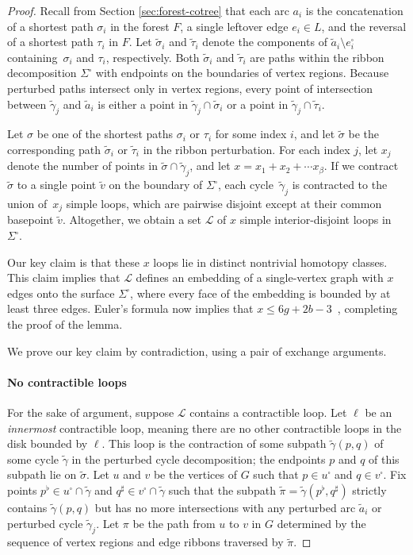 \documentclass[letterpaper,review]{siamart190516}
\begin{document}
\begin{proof}
Recall from Section \ref{sec:forest-cotree} that each arc $a_i$ is the concatenation of a shortest path $\sigma_i$ in the forest $F$, a single leftover edge $e_i\in L$, and the reversal of a shortest path $\tau_i$ in $F$.  Let $\tilde\sigma_i$ and $\tilde\tau_i$ denote the components of $\tilde{a}_i \setminus e_i^\square$ containing~$\sigma_i$ and $\tau_i$, respectively.  Both $\tilde\sigma_i$ and $\tilde\tau_i$ are paths within the ribbon decomposition $\Sigma^\square$ with endpoints on the boundaries of vertex regions.  Because perturbed paths intersect only in vertex regions, every point of intersection between $\tilde\gamma_j$ and $\tilde{a}_i$ is either a point in $\tilde\gamma_j\cap\tilde\sigma_i$ or a point in $\tilde\gamma_j\cap\tilde\tau_i$.

Let $\sigma$ be one of the shortest paths $\sigma_i$ or $\tau_i$ for some index $i$, and let $\tilde\sigma$ be the corresponding path $\tilde\sigma_i$ or $\tilde\tau_i$ in the ribbon perturbation.  For each index $j$, let $x_j$ denote the number of points in $\tilde\sigma \cap \tilde\gamma_j$, and let $x = x_1 + x_2 + \cdots x_\beta$.  If we contract $\tilde\sigma$ to a single point $\tilde{v}$ on the boundary of $\Sigma^\square$, each cycle~$\tilde\gamma_j$ is contracted to the union of~$x_j$ simple loops, which are pairwise disjoint except at their common basepoint $\tilde{v}$.  Altogether, we obtain a set $\mathcal{L}$ of $x$ simple interior-disjoint loops in $\Sigma^\square$.

Our key claim is that these $x$ loops lie in distinct nontrivial homotopy classes.  This claim implies that $\mathcal{L}$ defines an embedding of a single-vertex graph with $x$ edges onto the surface $\Sigma^\square$, where every face of the embedding is bounded by at least three edges.  Euler's formula now implies that $x\le 6g+2b-3$~\cite[Lemma~2.1]{ccelw-scsih-08}, completing the proof of the lemma.

We prove our key claim by contradiction, using a pair of exchange arguments.

\medskip
\paragraph{\textbf{No contractible loops}}
%
For the sake of argument, suppose $\mathcal{L}$ contains a contractible loop.  Let $\ell$ be an \emph{innermost} contractible loop, meaning there are no other contractible loops in the disk bounded by $\ell$.  This loop is the contraction of some subpath $\tilde\gamma(p,q)$ of some cycle $\tilde\gamma$ in the perturbed cycle decomposition; the endpoints $p$ and $q$ of this subpath lie on $\tilde\sigma$.  Let $u$ and $v$ be the vertices of $G$ such that $p\in u^\square$ and $q\in v^\square$.  Fix points $p^\flat \in u^\square\cap \tilde\gamma$ and $q^\sharp \in v^\square\cap\tilde\gamma$ such that the subpath $\tilde\pi = \tilde\gamma(p^\flat, q^\sharp)$ strictly contains $\tilde\gamma(p,q)$ but has no more intersections with any perturbed arc $\tilde{a}_i$ or perturbed cycle $\tilde\gamma_j$.  Let $\pi$ be the path from $u$ to $v$ in $G$ determined by the sequence of vertex regions and edge ribbons traversed by $\tilde\pi$.


\end{proof}
\end{document}
